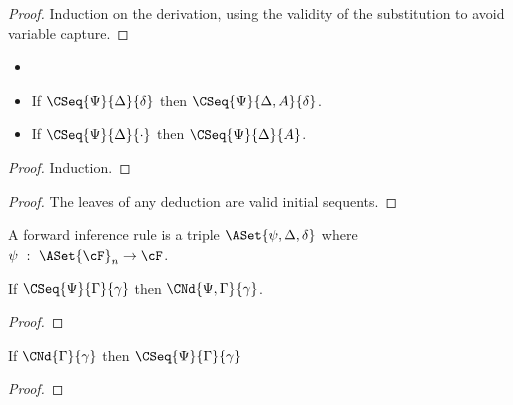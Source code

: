 \begin{proof}
  Induction on the derivation, using the validity of the
  substitution to avoid variable capture.
\end{proof}

\begin{theorem}[Weakening]
  \begin{itemize}
  \item[]
  \item
    If $\CSeq{\Psi}{\Delta}{\delta}$ then $\CSeq{\Psi}{\Delta,A}{\delta}$.
  \item
    If $\CSeq{\Psi}{\Delta}{\cdot}$ then $\CSeq{\Psi}{\Delta}{A}$.
  \end{itemize}
\end{theorem}
\begin{proof} Induction. \end{proof}

\begin{proof} The leaves of any deduction are valid initial sequents. \end{proof}

\begin{definition}
  A forward inference rule is a triple $\ASet{\psi,\Delta,\delta}$
  where $\psi~:~\ASet{\cF}_n\to\cF$.
\end{definition}

\begin{definition}

\end{definition}

\begin{definition}

\end{definition}



\begin{theorem}[Soundness]
  If $\CSeq{\Psi}{\Gamma}{\gamma}$ then $\CNd{\Psi,\Gamma}{\gamma}$.
\end{theorem}
\begin{proof}

\end{proof}

\begin{theorem}[Completeness]
  If $\CNd{\Gamma}{\gamma}$ then $\CSeq{\Psi}{\Gamma}{\gamma}$
\end{theorem}
\begin{proof}

\end{proof}

